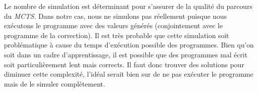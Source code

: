 Le nombre de simulation est déterminant pour s'assurer de la qualité du parcours du \textit{MCTS}. Dans notre cas, nous ne simulons pas réellement puisque nous exécutons le programme avec des valeurs générés (conjointement avec le programme de la correction). Il est très probable que cette simulation soit problématique à cause du temps d'exécution possible des programmes. Bien qu'on soit dans un cadre d'apprentissage, il est possible que des programmes mal écrit soit particulièrement lent mais corrects. Il faut donc trouver des solutions pour diminuer cette complexité, l'idéal serait bien sur de ne pas exécuter le programme mais de le simuler complètement.
